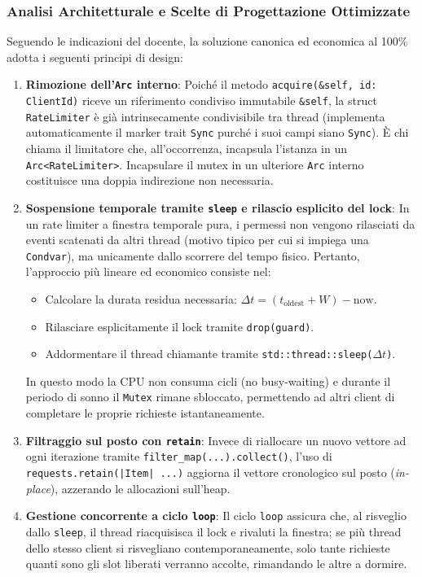 \documentclass[11pt,a4paper]{article}
\begin{document}
\subsubsection*{Analisi Architetturale e Scelte di Progettazione Ottimizzate}
Seguendo le indicazioni del docente, la soluzione canonica ed economica al 100\% adotta i seguenti principi di design:
\begin{enumerate}[leftmargin=1.5em]
    \item \textbf{Rimozione dell'\texttt{Arc} interno}: Poiché il metodo \texttt{acquire(\&self, id: ClientId)} riceve un riferimento condiviso immutabile \texttt{\&self}, la struct \texttt{RateLimiter} è già intrinsecamente condivisibile tra thread (implementa automaticamente il marker trait \texttt{Sync} purché i suoi campi siano \texttt{Sync}). È chi chiama il limitatore che, all'occorrenza, incapsula l'istanza in un \texttt{Arc<RateLimiter>}. Incapsulare il mutex in un ulteriore \texttt{Arc} interno costituisce una doppia indirezione non necessaria.
    \item \textbf{Sospensione temporale tramite \texttt{sleep} e rilascio esplicito del lock}: In un rate limiter a finestra temporale pura, i permessi non vengono rilasciati da eventi scatenati da altri thread (motivo tipico per cui si impiega una \texttt{Condvar}), ma unicamente dallo scorrere del tempo fisico. Pertanto, l'approccio più lineare ed economico consiste nel:
    \begin{itemize}
        \item Calcolare la durata residua necessaria: $\Delta t = (t_{\text{oldest}} + W) - \text{now}$.
        \item Rilasciare esplicitamente il lock tramite \texttt{drop(guard)}.
        \item Addormentare il thread chiamante tramite \texttt{std::thread::sleep($\Delta t$)}.
    \end{itemize}
    In questo modo la CPU non consuma cicli (no busy-waiting) e durante il periodo di sonno il \texttt{Mutex} rimane sbloccato, permettendo ad altri client di completare le proprie richieste istantaneamente.
    \item \textbf{Filtraggio sul posto con \texttt{retain}}: Invece di riallocare un nuovo vettore ad ogni iterazione tramite \texttt{filter\_map(...).collect()}, l'uso di \texttt{requests.retain(|Item| ...)} aggiorna il vettore cronologico sul posto (\emph{in-place}), azzerando le allocazioni sull'heap.
    \item \textbf{Gestione concorrente a ciclo \texttt{loop}}: Il ciclo \texttt{loop} assicura che, al risveglio dallo \texttt{sleep}, il thread riacquisisca il lock e rivaluti la finestra; se più thread dello stesso client si risvegliano contemporaneamente, solo tante richieste quanti sono gli slot liberati verranno accolte, rimandando le altre a dormire.
\end{enumerate}
\end{document}
